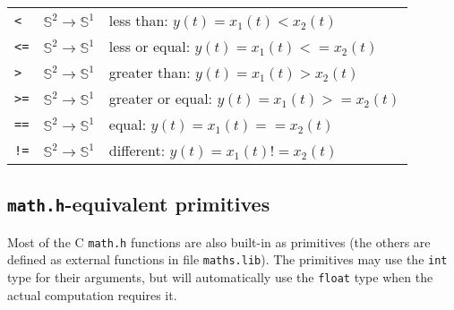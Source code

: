 \begin{tabular}{|l|l|l|}
\texttt{<} & $\mathbb{S}^{2}\rightarrow\mathbb{S}^{1}$ & less than: $y(t)=x_{1}(t) < x_{2}(t)$  			 \\
\texttt{<=} & $\mathbb{S}^{2}\rightarrow\mathbb{S}^{1}$ & less or equal: $y(t)=x_{1}(t) <= x_{2}(t)$  		 \\
\texttt{>} & $\mathbb{S}^{2}\rightarrow\mathbb{S}^{1}$ & greater than: $y(t)=x_{1}(t) > x_{2}(t)$   	   	 \\
\texttt{>=} & $\mathbb{S}^{2}\rightarrow\mathbb{S}^{1}$ & greater or equal: $y(t)=x_{1}(t) >= x_{2}(t)$   	 \\
\texttt{==} & $\mathbb{S}^{2}\rightarrow\mathbb{S}^{1}$ & equal: $y(t)=x_{1}(t) == x_{2}(t)$ 			 \\
\texttt{!=} & $\mathbb{S}^{2}\rightarrow\mathbb{S}^{1}$ & different: $y(t)=x_{1}(t) != x_{2}(t)$  			\\

\hline

\end{tabular}

\bigskip

\subsection{\texttt{math.h}-equivalent primitives}

Most of the C \texttt{math.h} functions are also built-in as primitives (the others are defined as external functions in file \texttt{maths.lib}). 
The primitives may use the \texttt{int} type for their arguments, but will automatically use the \texttt{float} type when the actual computation requires it.

\bigskip

